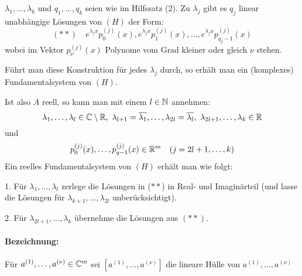 \documentclass{article}
\begin{document}
\begin{satz}
$\lambda_1,\ldots,\lambda_k$ und $q_1,\ldots,q_k$ seien wie im Hilfssatz (2). Zu $\lambda_j$ gibt es $q_j$ linear unabhängige Lösungen von $(H)$ der Form:
\[ (**)\quad e^{\lambda_jx}p_0^{(j)}(x), e^{\lambda_jx}p_1^{(j)}(x), \ldots, e^{\lambda_jx}p_{q_j-1}^{(j)}(x) \]
wobei im Vektor $p_\nu^{(j)}(x)$ Polynome vom Grad kleiner oder gleich $\nu$ stehen.

Führt man diese Konstruktion für jedes $\lambda_j$ durch, so erhält man ein (komplexes) Fundamentalsystem von $(H)$.

Ist also $A$ reell, so kann man mit einem $l\in\mathbb{N}$ annehmen:
\[ \lambda_1,\ldots,\lambda_l \in \MdC\setminus\MdR,\ \lambda_{l+1} = \overline{\lambda_1},\ldots,\lambda_{2l} = \overline{\lambda_l},\ \lambda_{2l+1},\ldots,\lambda_k \in \MdR \]
und 
\[ p_0^{(j)}(x), \ldots, p_{q-1}^{(j)}(x) \in \mathbb{R}^m \quad (j=2l+1,\ldots,k)\]
Ein reelles Fundamentalsystem von $(H)$ erhält man wie folgt:

1. Für $\lambda_1,\ldots,\lambda_l$ zerlege die Lösungen in ($**$) in Real- und Imaginärteil (und lasse die Lösungen für $\lambda_{k+1},\ldots,\lambda_{2l}$ unberücksichtigt).

2. Für $\lambda_{2l+1},\ldots,\lambda_{k}$ übernehme die Lösungen aus $(**)$.
\end{satz}

\paragraph{Bezeichnung:} Für $a^{(1)},\ldots,a^{(\nu)} \in \mathbb{C}^m$ sei $[a^{(1)},\ldots,a^{(\nu)}]$ die lineare Hülle von $a^{(1)},\ldots,a^{(\nu)}$
\end{document}
